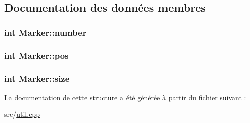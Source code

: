 \subsection{Documentation des données membres}
\hypertarget{struct_marker_a90e2cf96e8ae40c804bde2ed65d9d74d}{}
\subsubsection[{number}]{\setlength{\rightskip}{0pt plus 5cm}int Marker\+::number}\label{struct_marker_a90e2cf96e8ae40c804bde2ed65d9d74d}
\hypertarget{struct_marker_af3b00061170c89e879eb98d2285d863f}{}
\subsubsection[{pos}]{\setlength{\rightskip}{0pt plus 5cm}int Marker\+::pos}\label{struct_marker_af3b00061170c89e879eb98d2285d863f}
\hypertarget{struct_marker_a2ca66237318915e4c73c690465d65503}{}
\subsubsection[{size}]{\setlength{\rightskip}{0pt plus 5cm}int Marker\+::size}\label{struct_marker_a2ca66237318915e4c73c690465d65503}


La documentation de cette structure a été générée à partir du fichier suivant \+:\begin{DoxyCompactItemize}
\item 
src/\hyperlink{util_8cpp}{util.\+cpp}\end{DoxyCompactItemize}
